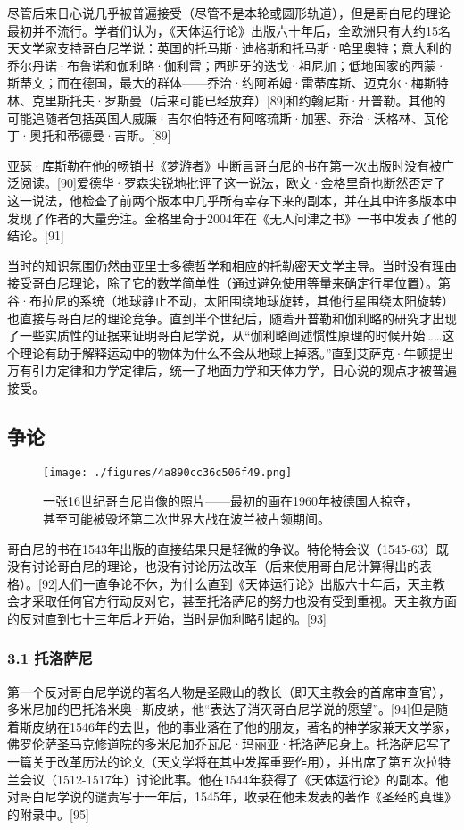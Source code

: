 尽管后来日心说几乎被普遍接受（尽管不是本轮或圆形轨道），但是哥白尼的理论最初并不流行。学者们认为，《天体运行论》出版六十年后，全欧洲只有大约15名天文学家支持哥白尼学说：英国的托马斯·迪格斯和托马斯·哈里奥特；意大利的乔尔丹诺·布鲁诺和伽利略·伽利雷；西班牙的迭戈·祖尼加；低地国家的西蒙·斯蒂文；而在德国，最大的群体——乔治·约阿希姆·雷蒂库斯、迈克尔·梅斯特林、克里斯托夫·罗斯曼（后来可能已经放弃）[89]和约翰尼斯·开普勒。其他的可能追随者包括英国人威廉·吉尔伯特还有阿喀琉斯·加塞、乔治·沃格林、瓦伦丁·奥托和蒂德曼·吉斯。[89]

亚瑟·库斯勒在他的畅销书《梦游者》中断言哥白尼的书在第一次出版时没有被广泛阅读。[90]爱德华·罗森尖锐地批评了这一说法，欧文·金格里奇也断然否定了这一说法，他检查了前两个版本中几乎所有幸存下来的副本，并在其中许多版本中发现了作者的大量旁注。金格里奇于2004年在《无人问津之书》一书中发表了他的结论。[91]

当时的知识氛围仍然由亚里士多德哲学和相应的托勒密天文学主导。当时没有理由接受哥白尼理论，除了它的数学简单性（通过避免使用等量来确定行星位置）。第谷·布拉尼的系统（地球静止不动，太阳围绕地球旋转，其他行星围绕太阳旋转）也直接与哥白尼的理论竞争。直到半个世纪后，随着开普勒和伽利略的研究才出现了一些实质性的证据来证明哥白尼学说，从“伽利略阐述惯性原理的时候开始……这个理论有助于解释运动中的物体为什么不会从地球上掉落。”直到艾萨克·牛顿提出万有引力定律和力学定律后，统一了地面力学和天体力学，日心说的观点才被普遍接受。

\subsection{争论}
\begin{figure}[ht]
\centering
\texttt{[image: ./figures/4a890cc36c506f49.png]}
\caption{一张16世纪哥白尼肖像的照片——最初的画在1960年被德国人掠夺，甚至可能被毁坏第二次世界大战在波兰被占领期间。} \label{fig_GBN_24}
\end{figure}
哥白尼的书在1543年出版的直接结果只是轻微的争议。特伦特会议（1545-63）既没有讨论哥白尼的理论，也没有讨论历法改革（后来使用哥白尼计算得出的表格）。[92]人们一直争论不休，为什么直到《天体运行论》出版六十年后，天主教会才采取任何官方行动反对它，甚至托洛萨尼的努力也没有受到重视。天主教方面的反对直到七十三年后才开始，当时是伽利略引起的。[93]

\subsubsection{3.1 托洛萨尼}
第一个反对哥白尼学说的著名人物是圣殿山的教长（即天主教会的首席审查官），多米尼加的巴托洛米奥·斯皮纳，他“表达了消灭哥白尼学说的愿望”。[94]但是随着斯皮纳在1546年的去世，他的事业落在了他的朋友，著名的神学家兼天文学家，佛罗伦萨圣马克修道院的多米尼加乔瓦尼·玛丽亚·托洛萨尼身上。托洛萨尼写了一篇关于改革历法的论文（天文学将在其中发挥重要作用），并出席了第五次拉特兰会议（1512-1517年）讨论此事。他在1544年获得了《天体运行论》的副本。他对哥白尼学说的谴责写于一年后，1545年，收录在他未发表的著作《圣经的真理》的附录中。[95]

